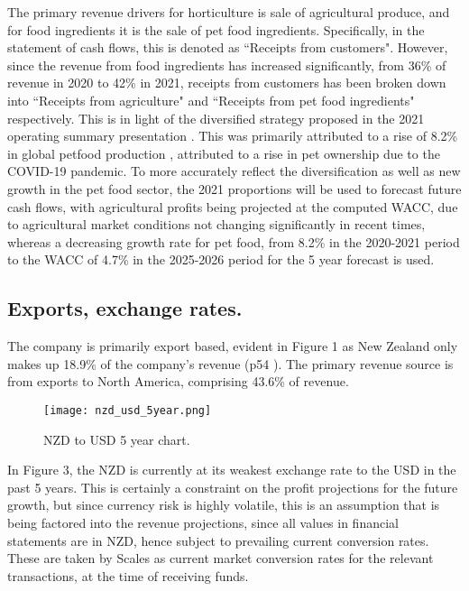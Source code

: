 \documentclass{article}
\begin{document}
\noindent
The primary revenue drivers for horticulture is sale of agricultural produce, and for food ingredients it is the sale of pet food ingredients. Specifically, in the statement of cash flows, this is denoted as ``Receipts from customers". However, since the revenue from food ingredients has increased significantly, from 36\% of revenue in 2020 to 42\% in 2021, receipts from customers has been broken down into ``Receipts from agriculture" and ``Receipts from pet food ingredients" respectively. This is in light of the diversified strategy proposed in the 2021 operating summary presentation \cite{2021operating_summary}. This was primarily attributed to a rise of 8.2\% in global petfood production \cite{petfood}, attributed to a rise in pet ownership due to the COVID-19 pandemic. To more accurately reflect the diversification as well as new growth in the pet food sector, the 2021 proportions will be used to forecast future cash flows, with agricultural profits being projected at the computed WACC, due to agricultural market conditions not changing significantly in recent times, whereas a decreasing growth rate for pet food, from 8.2\% in the 2020-2021 period to the WACC of 4.7\% in the 2025-2026 period for the 5 year forecast is used. \\

\newpage
\subsection{Exports, exchange rates.}
\noindent
The company is primarily export based, evident in Figure 1 as New Zealand only makes up 18.9\% of the company's revenue (p54 \cite{2021annual_report}). The primary revenue source is from exports to North America, comprising 43.6\% of revenue.

\begin{figure}[h]
    \centering
    \texttt{[image: nzd\_usd\_5year.png]}
    \caption{NZD to USD 5 year chart.}
\end{figure}

In Figure 3, the NZD is currently at its weakest exchange rate to the USD in the past 5 years. This is certainly a constraint on the profit projections for the future growth, but since currency risk is highly volatile, this is an assumption that is being factored into the revenue projections, since all values in financial statements are in NZD, hence subject to prevailing current conversion rates. These are taken by Scales as current market conversion rates for the relevant transactions, at the time of receiving funds.
\end{document}
